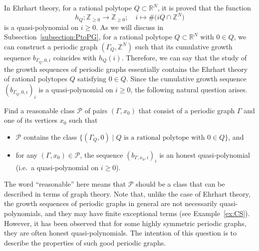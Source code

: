 \documentclass[ALCO,published]{cedram}
\theoremstyle{remark}
\begin{document}
In Ehrhart theory, for a rational polytope $Q \subset \mathbb{R}^N$, it is proved that 
the function 
\[
h_Q:\mathbb{Z}_{\ge 0} \to \mathbb{Z}_{\ge 0};\quad i \mapsto \# \bigl( iQ \cap \mathbb{Z}^N \bigr)
\]
is a quasi-polynomial on $i \ge 0$. 
As we will discuss in Subsection~\ref{subsection:PtoPG}, for a rational polytope $Q \subset \mathbb{R}^N$ with $0 \in Q$, we can construct a periodic graph $(\Gamma _{Q}, \mathbb{Z}^N)$ such that its cumulative growth sequence $b_{\Gamma _Q, 0, i}$ coincides with $h_Q(i)$. 
Therefore, we can say that the study of the growth sequences of periodic graphs essentially contains the Ehrhart theory of rational polytopes $Q$ satisfying $0 \in Q$. 
Since the cumulative growth sequence $(b_{\Gamma _Q, 0, i})_i$ is a quasi-polynomial on $i \ge 0$, the following natural question arises. 
\begin{quest}\label{quest:qp}
Find a reasonable class $\mathcal{P}$ of pairs $(\Gamma, x_0)$ that consist of a periodic graph $\Gamma$ and one of its vertices $x_0$ such that 
\begin{itemize}
\item 
$\mathcal{P}$ contains the class $\{ (\Gamma _Q, 0) \mid \text{$Q$ is a rational polytope with $0 \in Q$} \}$, and 

\item 
for any $(\Gamma , x_0) \in \mathcal{P}$, the sequence $(b_{\Gamma, x_0, i})_i$ is an honest quasi-polynomial (i.e.\ a quasi-polynomial on $i \ge 0$).
\end{itemize}
\end{quest}
\noindent
The word ``reasonable'' here means that $\mathcal{P}$ should be a class that can be described in terms of graph theory. 
Note that, unlike the case of Ehrhart theory, the growth sequences of periodic graphs in general are not necessarily quasi-polynomials, 
and they may have finite exceptional terms (see Example~\ref{ex:CS}). 
However, it has been observed that for some highly symmetric periodic graphs, they are often honest quasi-polynomials. 
The intention of this question is to describe the properties of such good periodic graphs.
\end{document}
